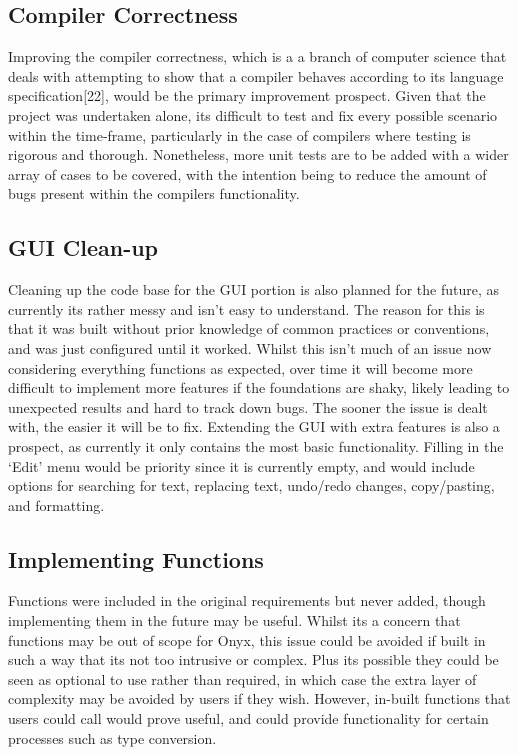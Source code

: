 \documentclass[
]{report}
\begin{document}
\subsection{Compiler Correctness}
Improving the compiler correctness, which is a a branch of computer
science that deals with attempting to show that a compiler behaves
according to its language specification{[}22{]}, would be the primary
improvement prospect. Given that the project was undertaken alone, its
difficult to test and fix every possible scenario within the time-frame,
particularly in the case of compilers where testing is rigorous and
thorough. Nonetheless, more unit tests are to be added with a wider
array of cases to be covered, with the intention being to reduce the
amount of bugs present within the compilers functionality.

\subsection{GUI Clean-up}
Cleaning up the code base for the GUI portion is also planned for the
future, as currently its rather messy and isn't easy to understand. The
reason for this is that it was built without prior knowledge of common
practices or conventions, and was just configured until it worked.
Whilst this isn't much of an issue now considering everything functions
as expected, over time it will become more difficult to implement more
features if the foundations are shaky, likely leading to unexpected
results and hard to track down bugs. The sooner the issue is dealt with,
the easier it will be to fix. Extending the GUI with extra features is
also a prospect, as currently it only contains the most basic
functionality. Filling in the `Edit' menu would be priority since it is
currently empty, and would include options for searching for text,
replacing text, undo/redo changes, copy/pasting, and formatting.

\subsection{Implementing Functions}
Functions were included in the original requirements but never added,
though implementing them in the future may be useful. Whilst its a
concern that functions may be out of scope for Onyx, this issue could be
avoided if built in such a way that its not too intrusive or complex.
Plus its possible they could be seen as optional to use rather than
required, in which case the extra layer of complexity may be avoided by
users if they wish. However, in-built functions that users could call
would prove useful, and could provide functionality for certain
processes such as type conversion.
\end{document}
